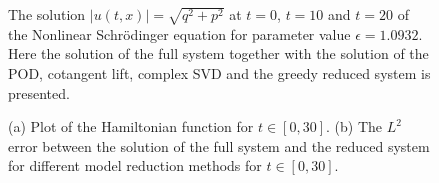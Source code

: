 \begin{figure}
\caption{The solution $|u(t,x)| = \sqrt{q^2 + p^2}$ at $t=0$, $t=10$ and $t=20$ of the Nonlinear Schr\"odinger equation for parameter value $\epsilon = 1.0932$. Here the solution of {\edit the} full system together with the solution of the POD, cotangent lift, complex SVD and the greedy reduced system is presented.}
\label{fig:NuRe:3}
\end{figure}

\begin{figure}

\begin{minipage}{.5\linewidth}
\centering
{}
\end{minipage}%
\begin{minipage}{.5\linewidth}
\centering
{}
\end{minipage}\par\medskip
\centering

\caption{{\edit (a) Plot of the Hamiltonian function for $t \in [0,30]$.} (b) The $L^2$ error between the solution of the full system and the reduced system for different model reduction methods for $t \in [0,30]$. }
\label{fig:NuRe:4}
\end{figure}


